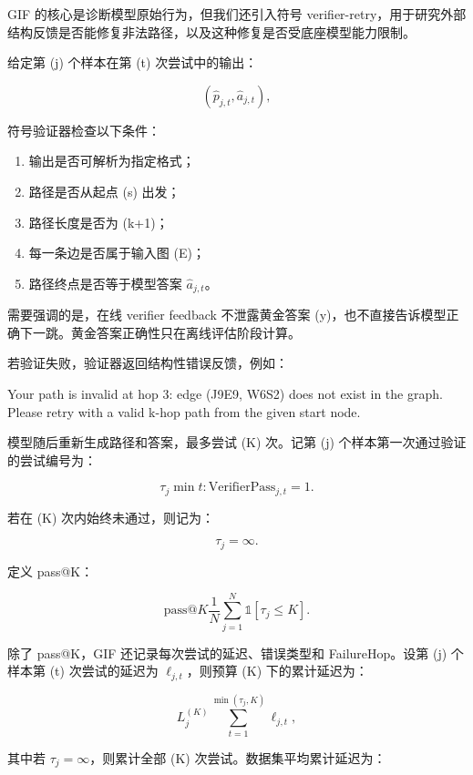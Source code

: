\documentclass[
  11pt,
]{article}
\newenvironment{Shaded}{}{}
\newcommand{\NormalTok}[1]{#1}
\begin{document}
GIF 的核心是诊断模型原始行为，但我们还引入符号
verifier-retry，用于研究外部结构反馈是否能修复非法路径，以及这种修复是否受底座模型能力限制。

给定第 (j) 个样本在第 (t) 次尝试中的输出：

\[
(\hat{p}_{j,t},\hat{a}_{j,t}),  
\]

符号验证器检查以下条件：

\begin{enumerate}
\def\labelenumi{\arabic{enumi}.}
\item
  输出是否可解析为指定格式；
\item
  路径是否从起点 (s) 出发；
\item
  路径长度是否为 (k+1)；
\item
  每一条边是否属于输入图 (E)；
\item
  路径终点是否等于模型答案 \(\hat{a}_{j,t}\)。
\end{enumerate}

需要强调的是，在线 verifier feedback 不泄露黄金答案
(y)，也不直接告诉模型正确下一跳。黄金答案正确性只在离线评估阶段计算。

若验证失败，验证器返回结构性错误反馈，例如：

\begin{Shaded}
\begin{Highlighting}[]
\NormalTok{Your path is invalid at hop 3:}
\NormalTok{edge (J9E9, W6S2) does not exist in the graph.}
\NormalTok{Please retry with a valid k{-}hop path from the given start node.}
\end{Highlighting}
\end{Shaded}

模型随后重新生成路径和答案，最多尝试 (K) 次。记第 (j)
个样本第一次通过验证的尝试编号为：

\[
\tau_j
\min  
{  
t:  
\mathrm{VerifierPass}_{j,t}=1  
}.  
\]

若在 (K) 次内始终未通过，则记为：

\[
\tau_j=\infty.  
\]

定义 pass@K：

\[
\mathrm{pass@}K
\frac{1}{N}  
\sum_{j=1}^{N}  
\mathbb{1}  
[  
\tau_j\le K  
].  
\]

除了 pass@K，GIF 还记录每次尝试的延迟、错误类型和 FailureHop。设第 (j)
个样本第 (t) 次尝试的延迟为 \(\ell_{j,t}\)，则预算 (K) 下的累计延迟为：

\[
L_j^{(K)}
\sum_{t=1}^{\min(\tau_j,K)}  
\ell_{j,t},  
\]

其中若 \(\tau_j=\infty\)，则累计全部 (K) 次尝试。数据集平均累计延迟为：
\end{document}
